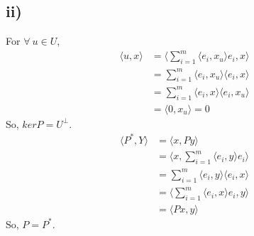 \documentclass{article}
\begin{document}
\subsection*{ii)}
For $\forall~u\in U$,
\begin{align*}
\langle u,x\rangle&=\langle \displaystyle{\sum^{m}_{i=1}}\langle e_i,x_u\rangle e_i,x\rangle\\
&=\displaystyle{\sum^{m}_{i=1}}\langle e_i,x_u\rangle \langle e_i,x\rangle\\
&=\displaystyle{\sum^{m}_{i=1}}\langle e_i,x\rangle \langle e_i,x_u\rangle\\
&=\langle 0,x_u\rangle=0
\end{align*}
So, $kerP=U^\perp$.
\begin{align*}
\langle P^*,Y\rangle &=\langle x,Py\rangle\\
&=\langle x,\displaystyle{\sum^{m}_{i=1}}\langle e_i,y\rangle e_i\rangle\\
&=\displaystyle{\sum^{m}_{i=1}}\langle e_i,y\rangle \langle e_i,x\rangle\\
&=\langle \displaystyle{\sum^{m}_{i=1}}\langle e_i,x\rangle e_i,y\rangle\\
&=\langle Px,y\rangle
\end{align*}
So, $P=P^*$.
\end{document}
